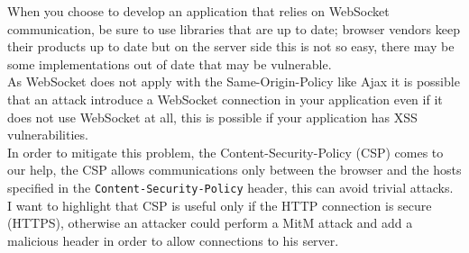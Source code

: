 	When you choose to develop an application that relies on WebSocket communication, be sure to use libraries that are up to date; browser vendors keep their products up to date
	but on the server side this is not so easy, there may be some implementations out of date that may be vulnerable.\\
	
	As WebSocket does not apply with the Same-Origin-Policy like Ajax it is possible that an attack introduce a WebSocket connection in your application even if it
	does not use WebSocket at all, this is possible if your application has XSS vulnerabilities.\\
	In order to mitigate this problem, the Content-Security-Policy (CSP) comes to our help, the CSP allows communications only between the browser and the hosts specified in the
	\texttt{Content-Security-Policy} header, this can avoid trivial attacks.\\
	I want to highlight that CSP is useful only if the HTTP connection is secure (HTTPS), otherwise an attacker could perform a MitM attack and add a malicious header in order to allow
	connections to his server.\\
	